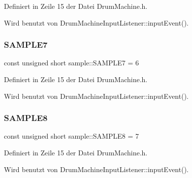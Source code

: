 Definiert in Zeile 15 der Datei Drum\+Machine.\+h.



Wird benutzt von Drum\+Machine\+Input\+Listener\+::input\+Event().

\mbox{\label{namespacesample_ad35669bc942fa6aa53d1d261f7257a3e}} 
\subsubsection{\texorpdfstring{S\+A\+M\+P\+L\+E7}{SAMPLE7}}
{\footnotesize\ttfamily const unsigned short sample\+::\+S\+A\+M\+P\+L\+E7 = 6}



Definiert in Zeile 15 der Datei Drum\+Machine.\+h.



Wird benutzt von Drum\+Machine\+Input\+Listener\+::input\+Event().

\mbox{\label{namespacesample_a941e99fc5405e8c43f53d75c486d0819}} 
\subsubsection{\texorpdfstring{S\+A\+M\+P\+L\+E8}{SAMPLE8}}
{\footnotesize\ttfamily const unsigned short sample\+::\+S\+A\+M\+P\+L\+E8 = 7}



Definiert in Zeile 15 der Datei Drum\+Machine.\+h.



Wird benutzt von Drum\+Machine\+Input\+Listener\+::input\+Event().

